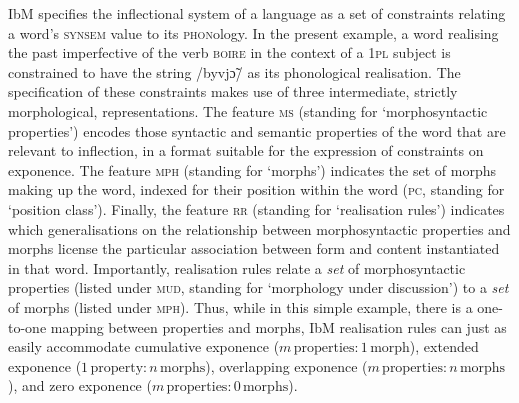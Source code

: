 \documentclass[output=paper]{langsci/langscibook}
\begin{document}
IbM specifies the inflectional system of a language as a set
of constraints relating a word's \textsc{synsem} value to its
\textsc{phon}ology. In the present example, a word realising the past
imperfective of the verb \textsc{boire} in the context of a
\textsc{1pl} subject is constrained to have the string /byvjɔ̃/
as its phonological realisation. The specification of these
constraints makes use of three intermediate, strictly morphological,
representations. The feature \textsc{ms} (standing for
`morphosyntactic properties') encodes those syntactic and semantic
properties of the word that are relevant to inflection, in a format
suitable for the expression of constraints on exponence. The feature
\textsc{mph} (standing for `morphs') indicates the set of morphs
making up the word, indexed for their position within the word
(\textsc{pc}, standing for `position class'). Finally, the feature
\textsc{rr} (standing for `realisation rules') indicates which
generalisations on the relationship between morphosyntactic properties
and morphs license the particular association between form and content
instantiated in that word. Importantly, realisation rules relate a
\emph{set} of morphosyntactic properties (listed under \textsc{mud},
standing for `morphology under discussion') to a \emph{set} of morphs
(listed under \textsc{mph}). Thus, while in this simple example, there
is a one-to-one mapping between properties and morphs, IbM realisation
rules can just as easily accommodate cumulative exponence
($m\, \text{properties}:1\, \text{morph}$), extended exponence
($1\, \text{property}:n\, \text{morphs}$), overlapping exponence
($m\, \text{properties}:n\, \text{morphs}$), and zero exponence
($m\, \text{properties}:0\, \text{morphs}$).
\end{document}
